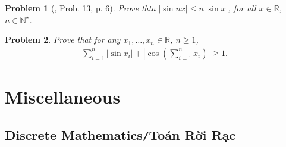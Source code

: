 \documentclass[oneside]{book}
\numberwithin{equation}{section}
\newtheorem{problem}{Problem}[section]
\begin{document}
\begin{problem}[\cite{Gelca_Andreescu2017}, Prob. 13, p. 6]
	Prove thta $|\sin nx|\le n|\sin x|$, for all $x\in\mathbb{R}$, $n\in\mathbb{N}^\star$.
\end{problem}

\begin{problem}
	Prove that for any $x_1,\ldots,x_n\in\mathbb{R}$, $n\ge 1$,
	\begin{align*}
		\sum_{i=1}^n |\sin x_i| + \left|\cos\left(\sum_{i=1}^n x_i\right)\right|\ge 1.
	\end{align*}
\end{problem}


\chapter{Miscellaneous}

\section{Discrete Mathematics\texttt{/}Toán Rời Rạc}
\end{document}
